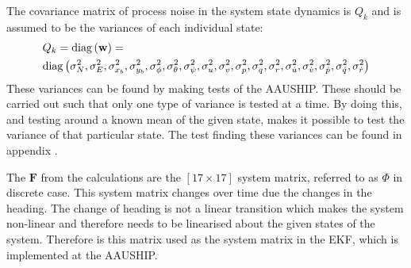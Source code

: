 The covariance matrix of process noise in the system state dynamics is $Q_k$ and is assumed to be the variances of each individual state:
\begin{align}
&Q_k = \mathrm{diag}\left(\mathbf{w}\right) = \\\nonumber
&\mathrm{diag}\left(\sigma_{N}^2, \sigma_{E}^2, \sigma_{x_{b}}^2, \sigma_{y_{b}}^2, \sigma_{\phi}^2, \sigma_{\theta}^2, \sigma_{\psi}^2, \sigma_{u}^2, \sigma_{v}^2, \sigma_{p}^2, \sigma_{q}^2, \sigma_{r}^2, \sigma_{\dot u}^2, \sigma_{\dot v}^2, \sigma_{\dot p}^2, \sigma_{\dot q}^2, \sigma_{\dot r}^2\right)
\end{align}
These variances can be found by making tests of the AAUSHIP. These should be carried out such that only one type of variance is tested at a time. By doing this, and testing around a known mean of the given state, makes it possible to test the variance of that particular state. The test finding these variances can be found in appendix .

The $\mathbf F$ from the calculations are the $[17 \times 17]$ system matrix, referred to as $\Phi$ in discrete case. This system matrix changes over time due the changes in the heading. The change of heading is not a linear transition which makes the system non-linear and therefore needs to be linearised about the given states of the system. Therefore is this matrix used as the system matrix in the \ac{EKF}, which is implemented at the AAUSHIP. 